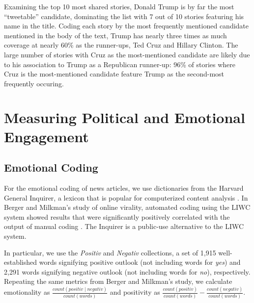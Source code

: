 \documentclass[letterpaper]{article}
\begin{document}


Examining the top 10 most shared stories, Donald Trump is by far the most ``tweetable'' candidate, dominating the list with 7 out of 10 stories featuring his name in the title. Coding each story by the most frequently mentioned candidate mentioned in the body of the text, Trump has nearly three times as much coverage at nearly 60\% as the runner-ups, Ted Cruz and Hillary Clinton. The large number of stories with Cruz as the most-mentioned candidate are likely due to his association to Trump as a Republican runner-up: 96\% of stories where Cruz is the most-mentioned candidate feature Trump as the second-most frequently occuring. 

\section{Measuring Political and Emotional Engagement}

\subsection{Emotional Coding}
For the emotional coding of news articles, we use dictionaries from the Harvard General Inquirer, a lexicon that is popular for computerized content analysis \cite{stone1963computer}. In Berger and Milkman's study of online virality, automated coding using the LIWC system showed results that were significantly positively correlated with the output of manual coding \cite{berger2012makes}. The Inquirer is a public-use alternative to the LIWC system. 

In particular, we use the \emph{Positiv} and \emph{Negativ} collections, a set of 1,915 well-established words signifying positive outlook (not including words for \emph{yes}) and 2,291 words signifying negative outlook (not including words for \emph{no}), respectively. Repeating the same metrics from Berger and Milkman's study, we calculate emotionality as $\frac{count(positiv \mid negativ)}{count(words)}$ and positivity as $\frac{count(positiv)}{count(words)} - \frac{count(negativ)}{count(words)}$.

\end{document}

